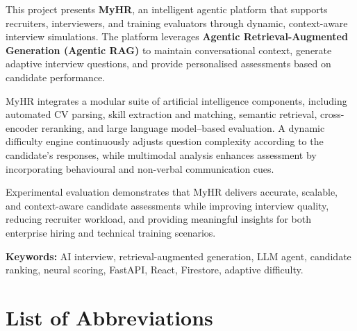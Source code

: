 \documentclass[12pt,a4paper,oneside]{report}
\begin{document}
This project presents \textbf{MyHR}, an intelligent agentic platform that supports recruiters,
interviewers, and training evaluators through dynamic, context-aware interview simulations. The
platform leverages \textbf{Agentic Retrieval-Augmented Generation (Agentic RAG)} to maintain
conversational context, generate adaptive interview questions, and provide personalised
assessments based on candidate performance.

MyHR integrates a modular suite of artificial intelligence components, including automated CV
parsing, skill extraction and matching, semantic retrieval, cross-encoder reranking, and large
language model--based evaluation. A dynamic difficulty engine continuously adjusts question
complexity according to the candidate's responses, while multimodal analysis enhances assessment
by incorporating behavioural and non-verbal communication cues.

Experimental evaluation demonstrates that MyHR delivers accurate, scalable, and context-aware
candidate assessments while improving interview quality, reducing recruiter workload, and
providing meaningful insights for both enterprise hiring and technical training scenarios.

\vspace{1em}
\noindent\textbf{Keywords:} AI interview, retrieval-augmented generation, LLM agent, candidate
ranking, neural scoring, FastAPI, React, Firestore, adaptive difficulty.

\clearpage

\pagestyle{fancy}
\tableofcontents
\clearpage

\listoffigures
{}
\clearpage

\listoftables
{}
\clearpage

\chapter*{List of Abbreviations}
\end{document}

